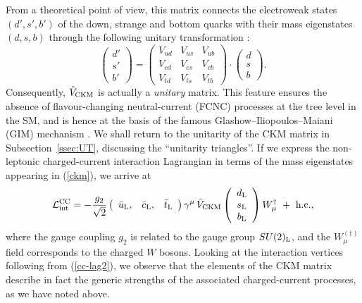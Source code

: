 \documentclass[12pt]{article}
\begin{document}
From a theoretical point of view, this matrix connects the electroweak 
states $(d',s',b')$ of the down, strange and bottom quarks with their 
mass eigenstates $(d,s,b)$ through the following unitary transformation 
\cite{buchmueller}:
\begin{equation}\label{ckm}
\left(\begin{array}{c}
d'\\
s'\\
b'
\end{array}\right)=\left(\begin{array}{ccc}
V_{ud}&V_{us}&V_{ub}\\
V_{cd}&V_{cs}&V_{cb}\\
V_{td}&V_{ts}&V_{tb}
\end{array}\right)\cdot
\left(\begin{array}{c}
d\\
s\\
b
\end{array}\right).
\end{equation}
Consequently, $\hat V_{\rm CKM}$ is actually a {\it unitary} matrix.
This feature ensures the absence of flavour-changing neutral-current 
(FCNC) processes at the tree level in the SM, and is hence at the basis 
of the famous Glashow--Iliopoulos--Maiani (GIM) mechanism \cite{GIM}. 
We shall return to the unitarity of the CKM matrix in
Subsection~\ref{ssec:UT}, discussing the ``unitarity triangles''.
If we express the non-leptonic charged-current interaction Lagrangian 
in terms of the mass eigenstates appearing in (\ref{ckm}), we arrive at 
\begin{equation}\label{cc-lag2}
{\cal L}_{\mbox{{\scriptsize int}}}^{\mbox{{\scriptsize CC}}}=
-\frac{g_2}{\sqrt{2}}\left(\begin{array}{ccc}
\bar u_{\mbox{{\scriptsize L}}},& \bar c_{\mbox{{\scriptsize L}}},
&\bar t_{\mbox{{\scriptsize L}}}\end{array}\right)\gamma^\mu\,\hat
V_{\mbox{{\scriptsize CKM}}}
\left(\begin{array}{c}
d_{\mbox{{\scriptsize L}}}\\
s_{\mbox{{\scriptsize L}}}\\
b_{\mbox{{\scriptsize L}}}
\end{array}\right)W_\mu^\dagger\,\,+\,\,\mbox{h.c.,}
\end{equation}
where the gauge coupling $g_2$ is related to the gauge group 
$SU(2)_{\mbox{{\scriptsize L}}}$, and the $W_\mu^{(\dagger)}$ field 
corresponds to the charged $W$ bosons. Looking at the
interaction vertices following from (\ref{cc-lag2}), we observe 
that the elements of the CKM matrix describe in fact the generic
strengths of the associated charged-current processes, as we have 
noted above. 
\end{document}
